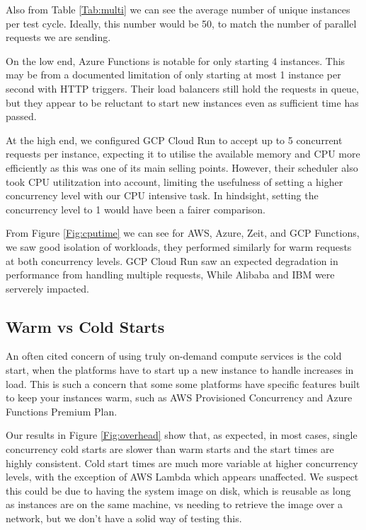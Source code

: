 \documentclass[11pt]{article}
\begin{document}
Also from Table \ref{Tab:multi}
we can see the average number of unique instances per test cycle.
Ideally, this number would be 50,
to match the number of parallel requests we are sending.

On the low end,
Azure Functions is notable for only starting 4 instances.
This may be from a documented limitation \cite{azure}
of only starting at most 1 instance per second with HTTP triggers.
Their load balancers still hold the requests in queue,
but they appear to be reluctant to start new instances even as sufficient time has passed.

At the high end,
we configured GCP Cloud Run to accept up to 5 concurrent requests per instance,
expecting it to utilise the available memory and CPU more efficiently as this was one of its main selling points.
However, their scheduler also took CPU utilitzation into account,
limiting the usefulness of setting a higher concurrency level with our CPU intensive task.
In hindsight, setting the concurrency level to 1 would have been a fairer comparison.

From Figure \ref{Fig:cputime} we can see for AWS, Azure, Zeit, and GCP Functions,
we saw good isolation of workloads,
they performed similarly for warm requests at both concurrency levels.
GCP Cloud Run saw an expected degradation in performance from handling multiple requests,
While Alibaba and IBM were serverely impacted.




\subsection{Warm vs Cold Starts}
An often cited concern of using truly on-demand compute services is the cold start,
when the platforms have to start up a new instance to handle increases in load.
This is such a concern that some some platforms have specific features
built to keep your instances warm, such as AWS Provisioned Concurrency \cite{ams}
and Azure Functions Premium Plan.

Our results in Figure \ref{Fig:overhead}
show that, as expected, in most cases,
single concurrency cold starts are slower than warm starts
and the start times are highly consistent.
Cold start times are much more variable at higher concurrency levels,
with the exception of AWS Lambda which appears unaffected.
We suspect this could be due to having the system image on disk,
which is reusable as long as instances are on the same machine,
vs needing to retrieve the image over a network,
but we don't have a solid way of testing this.
\end{document}
